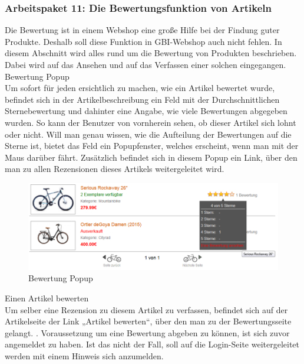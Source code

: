 \subsubsection{Arbeitspaket 11: Die Bewertungsfunktion von Artikeln}

Die Bewertung ist in einem Webshop eine große Hilfe bei der Findung guter Produkte. Deshalb soll diese Funktion in GBI-Webshop auch nicht fehlen. 
In diesem Abschnitt wird alles rund um die Bewertung von Produkten beschrieben. Dabei wird auf das Ansehen und auf das Verfassen einer solchen eingegangen.
\\
Bewertung Popup
\\
Um sofort für jeden ersichtlich zu machen, wie ein Artikel bewertet wurde, befindet sich in der Artikelbeschreibung ein Feld mit der Durchschnittlichen Sternebewertung und dahinter eine Angabe, wie viele Bewertungen abgegeben wurden. So kann der Benutzer von vornherein sehen, ob dieser Artikel sich lohnt oder nicht. Will man genau wissen, wie die Aufteilung der Bewertungen auf die Sterne ist, bietet das Feld ein Popupfenster, welches erscheint, wenn man mit der Maus darüber fährt. Zusätzlich befindet sich in diesem Popup ein Link, über den man zu allen Rezensionen dieses Artikels weitergeleitet wird.

\begin{figure}[H]
\begin{center}
\includegraphics[width=12cm]{Bilder/Michael_Abbildung10-BewertungPopup.png}
\end{center}
\caption{Bewertung Popup}
\end{figure}

Einen Artikel bewerten
\\
Um selber eine Rezension zu diesem Artikel zu verfassen, befindet sich auf der Artikelseite der Link „Artikel bewerten“, über den man zu der Bewertungsseite gelangt. 
. Voraussetzung um eine Bewertung abgeben zu können, ist sich zuvor angemeldet zu haben. Ist das nicht der Fall, soll auf die Login-Seite weitergeleitet werden mit einem Hinweis sich anzumelden.

